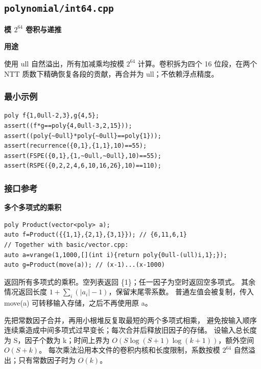 \documentclass[UTF8,a4paper,10pt]{ctexart}
\newcommand{\TemplUsage}[1]{\textbf{用途}\par #1\par}
\begin{document}
\subsection{\texttt{polynomial/int64.cpp}}
\textbf{模 $2^{64}$ 卷积与递推}\par
\TemplUsage{使用 ull 自然溢出，所有加减乘均按模 $2^{64}$ 计算。卷积拆为四个 16 位段，在两个 NTT 质数下精确恢复各段的贡献，再合并为 ull；不依赖浮点精度。}
\subsubsection*{最小示例}
\begin{lstlisting}
poly f{1,0ull-2,3},g{4,5};
assert((f*g==poly{4,0ull-3,2,15}));
assert((poly{~0ull}*poly{~0ull}==poly{1}));
assert(recurrence({0,1},{1,1},10)==55);
assert(FSPE({0,1},{1,~0ull,~0ull},10)==55);
assert(RSPE({0,2,2,4,6,10,16,26},10)==110);
\end{lstlisting}
\subsubsection*{接口参考}
\noindent\begin{minipage}{\textwidth}
\textbf{多个多项式的乘积}
\begin{lstlisting}
poly Product(vector<poly> a);
auto f=Product({{1,1},{2,1},{3,1}}); // {6,11,6,1}
// Together with basic/vector.cpp:
auto a=vrange(1,1000,[](int i){return poly{0ull-(ull)i,1};});
auto g=Product(move(a)); // (x-1)...(x-1000)
\end{lstlisting}
返回所有多项式的乘积。空列表返回 \{1\}；任一因子为空时返回空多项式。
其余情况返回长度 $1+\sum_i(\lvert a_i\rvert-1)$，保留末尾零系数。
普通左值会被复制，传入 move(a) 可转移输入存储，之后不再使用原 a。

先把常数因子合并，再用小根堆反复取最短的两个多项式相乘，
避免按输入顺序连续乘造成中间多项式过早变长；每次合并后释放旧因子的存储。
设输入总长度为 S，因子个数为 k；时间上界为
$O(S\log(S+1)\log(k+1))$，额外空间 $O(S+k)$。
每次乘法沿用本文件的卷积内核和长度限制，系数按模 $2^{64}$ 自然溢出；只有常数因子时为 $O(k)$。
\end{minipage}\par\vspace{0.4em}
\end{document}
